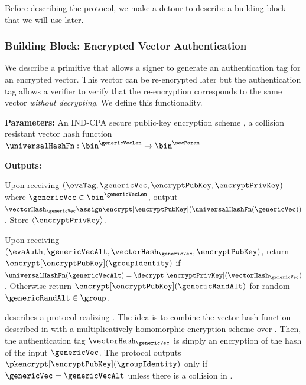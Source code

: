Before describing the protocol, we make a detour to describe a building block that we will use later.  

\newcommand{\clientKVS}{\ensuremath{S}\xspace}
\newcommand{\blindingRand}{\ensuremath{r_{b}}\xspace}

\subsubsection{Building Block: Encrypted Vector Authentication}
%
We describe a primitive that allows a signer to generate an authentication tag for an encrypted vector. This vector can
be re-encrypted later but the authentication tag allows a verifier to verify that the re-encryption corresponds to the same vector \emph{without decrypting}. 
We define this functionality. 

\begin{mdframed}[frametitle={\evaFunc: Encrypted Vector Authentication Functionality}, 
frametitlealignment=\centering, 
font=\small]

\noindent\textbf{Parameters:} An IND-CPA secure public-key encryption scheme \pkencryptionSchemeDefn, a collision resistant vector hash function 
$\universalHashFn: \bin^{\genericVecLen} \rightarrow \bin^{\secParam}$

\noindent\textbf{Outputs:} 

\enumListStart
\item Upon receiving $(\evaTag,\genericVec, \encryptPubKey, \encryptPrivKey)$ where $\genericVec \in \bin^{\genericVecLen}$,  output $\vectorHash_{\genericVec} \assign \encrypt[\encryptPubKey](\universalHashFn(\genericVec))$. Store $\langle \encryptPrivKey \rangle$.

\item Upon receiving $(\evaAuth, \genericVecAlt, \vectorHash_{\genericVec}, \encryptPubKey)$, return $\encrypt[\encryptPubKey](\groupIdentity)$ if $\universalHashFn(\genericVecAlt) = \decrypt[\encryptPrivKey](\vectorHash_{\genericVec})$. Otherwise return $\encrypt[\encryptPubKey](\genericRandAlt)$ for random $\genericRandAlt \in \group$.  
\enumListEnd


\end{mdframed}


 describes a protocol realizing \evaFunc.
The idea is to combine the vector hash function \universalHashFn described in  with a multiplicatively homomorphic encryption scheme over \group. Then, the authentication tag $\vectorHash_{\genericVec}$ is simply an encryption of the hash of the input $\genericVec$. The protocol outputs $\pkencrypt[\encryptPubKey](\groupIdentity)$ only if $\genericVec = \genericVecAlt$ unless there is a collision in \universalHashFn. 

